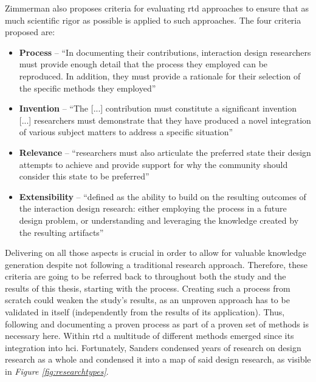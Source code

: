 Zimmerman also proposes criteria for evaluating \gls{rtd} approaches to ensure that as much scientific rigor as possible is applied to such approaches. The four criteria proposed are:

\begin{itemize}
  \item{\textbf{Process} -- \enquote{In documenting their contributions, interaction design researchers must provide enough detail that the process they employed can be reproduced. In addition, they must provide a rationale for their selection of the specific methods they employed} \cite[p. 499]{zimmerman2007research}}
  \item{\textbf{Invention} -- \enquote{The [...] contribution must constitute a significant invention [...] researchers must demonstrate that they have produced a novel integration of various subject matters to address a specific situation} \cite[p. 499]{zimmerman2007research}}
  \item{\textbf{Relevance} -- \enquote{researchers must also articulate the preferred state their design attempts to achieve and provide support for why the community should consider this state to be preferred} \cite[p. 499-500]{zimmerman2007research}}
  \item{\textbf{Extensibility} -- \enquote{defined as the ability to build on the resulting outcomes of the interaction design research: either employing the process in a future design problem, or understanding and leveraging the knowledge created by the resulting artifacts} \cite[p. 500]{zimmerman2007research}}
\end{itemize}

Delivering on all those aspects is crucial in order to allow for valuable knowledge generation despite not following a traditional research approach. Therefore, these criteria are going to be referred back to throughout both the study and the results of this thesis, starting with the process. Creating such a process from scratch could weaken the study's results, as an unproven approach has to be validated in itself (independently from the results of its application). Thus, following and documenting a proven process as part of a proven set of methods is necessary here. Within \gls{rtd} a multitude of different methods emerged since its integration into \gls{hci}. Fortunately, Sanders condensed years of research on design research as a whole and condensed it into a map of said design research, as visible in \textit{Figure \ref{fig:researchtypes}}.

